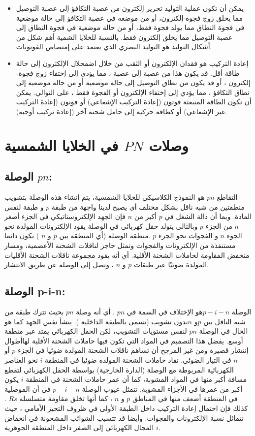 	\begin{itemize}
		\item 
		يمكن أن تكون عملية التوليد تحرير إلكترون من عصبة التكافؤ إلى عصبة التوصيل مما يخلق زوج فجوة-إلكترون، أو من موضعه في عصبة التكافؤ إلى حالة موضعية في فجوة النطاق مما يولد فجوة فقط، أو من حالة موضعية في فجوة النطاق إلى عصبة التوصيل مما يخلق إلكترون فقط. بالنسبة للخلايا الشمية أهم شكل من أشكال التوليد هو التوليد البصري الذي يعتمد على إمتصاص الفوتونات.
		\item إعادة التركيب هو فقدان الإلكترون أو الثقب من خلال اضمحلال الإلكترون إلى حالة طاقة أقل. قد يكون هذا من عصبة إلى عصبة ، مما يؤدي إلى إختفاء زوج فجوة-إلكترون ، أو قد يكون من نطاق التوصيل إلى حالة موضعية أو من حالة موضعية إلى نطاق التكافؤ ، مما يؤدي إلى إختفاء الإلكترون أو الفجوة فقط ، على التوالي. يمكن أن تكون الطاقة المنبعثة فوتون (إعادة التركيب الإشعاعي) أو فونون (إعادة التركيب غير الإشعاعي) أو كطاقة حركية إلى حامل شحنة آخر (إعادة تركيب أوجيه).
		
		
	\end{itemize}
	
	\section{وصلات $ PN $ في الخلايا الشمسية}
	\subsection{الوصلة $ pn $:} 
	التقاطع $ pn $ هو النموذج الكلاسيكي للخلايا الشمسية، يتم إنشاء هذه الوصلة بتشويب منطقتين من شبه ناقل بشكل مختلف أي يصبح لدينا واجهة من طبقة $ p $ و طبقة لنفس المادة. وبما أن دالة الشغل في $ p $ أكبر من $ n $ فإن الجهد الإلكتروستاتيكي في الجزء أصغر $ n $ من الجزء $ p $ وبالتالي يتولد حقل كهربائي في الوصلة يقود الإلكترونات المولدة نحو الجوء $ n $ و الفجوات نحو الجزء $ p $ .منطقة الوصلة (أي المنطقة بين $ p $ و $ n $ ) تكون دائما مستنفذة من الإلكترونات والفجوات وتمثل حاجز لناقلات الشحنة الأعضمية، ومسار منخفض المقاومة لحاملات الشحنة الأقلية. أي أنه يقود مجموعة ناقلات الشحنة الأقليات المولدة ضوئيًا عبر طبقات $ p $ و $ n $ ، وتصل إلى الوصلة عن طريق الانتشار.
	\subsection{الوصلة p-i-n:}
	الوصلة $ p-i-n $هو الإختلاف في السمة في $ pn $ . أي أنه وصلة $ pn $ بحيث تترك طبقة من شبه الناقل بين $ p $و $ n $بدون تشويب (تسمى بالطبقة الداخلية ). ينشأ نفس الجهد كما هو الحال في الوصلة $ pn $ لنفس مستويات التشويب، لكن الحقل الكهربائي يمتد عبر منطقة أوسع. يفضل هذا التصميم في المواد التي تكون فيها حاملات الشحنة الأقلية لهاأطوال إنتشار قصيرة ومن غير المرجح أن تساهم ناقلات الشحنة المولدة ضوئيا في الجزء $ p $ أو $ n $ في التيار الضوئي. تقاد حاملات الشحنة المولدة ضوئيا في المنطقة $ i $ نحو العناصر الكهربائية المربوطة مع الوصلة (الدارة الخارجية) بواسطة الحقل الكهربائي لتقطع مسافة أكبر منها في المواد المشوبة، كما أن عمر حاملات الشحنة في المنطقة $ i $ يكون أكبر من عمرها في الأجزاء المشوبة. تتمثل عيوب الوصلة $ p-i-n $ في أن الموصلية في المنطقة أضعف منها في المناطق $ p $ و $ n $ ، كما أنها تخلق مقاومة متسلسلة $ Rs $ . كذلك فإن احتمال إعادة التركيب داخل الطبقة الأولى في ظروف التحيز الأمامي ، حيث تتماثل نسبة الإلكترونات والفجوات. وأيضا قد تتسبب الشوائب المشحونة في انخفاض المجال الكهربائي إلى الصفر داخل المنطقة الجوهرية $ i $.
